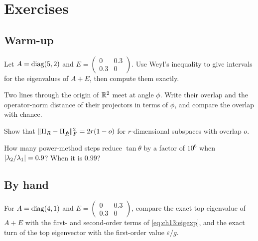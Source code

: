 \let\sectionmark\ompSavedSectionmarkxiii
\section*{Exercises}

\subsection*{Warm-up}

\begin{exercise}\label{exr:ch13:weyl}
Let $A=\operatorname{diag}(5,2)$ and $E=\begin{pmatrix}0&0.3\\0.3&0\end{pmatrix}$. Use Weyl's
inequality to give intervals for the eigenvalues of $A+E$, then compute them
exactly.
\end{exercise}

\begin{exercise}\label{exr:ch13:lines}
Two lines through the origin of $\mathbb{R}^2$ meet at angle $\phi$. Write their overlap
and the operator-norm distance of their projectors in terms of $\phi$, and compare
the overlap with chance.
\end{exercise}

\begin{exercise}\label{exr:ch13:projfrob}
Show that $\lVert \Pi_R-\Pi_{\hat R}\rVert_F^2=2r(1-o)$ for $r$-dimensional subspaces with
overlap $o$.
\end{exercise}

\begin{exercise}\label{exr:ch13:iters}
How many power-method steps reduce $\tan\theta$ by a factor of $10^{6}$ when
$\lvert \lambda_2/\lambda_1\rvert=0.9$? When it is $0.99$?
\end{exercise}

\subsection*{By hand}

\begin{exercise}\label{exr:ch13:second}
For $A=\operatorname{diag}(4,1)$ and $E=\begin{pmatrix}0&0.3\\0.3&0\end{pmatrix}$, compare the
exact top eigenvalue of $A+E$ with the first- and second-order terms of
\cref{eq:ch13:eigexp}, and the exact turn of the top eigenvector with the
first-order value $\varepsilon/g$.
\end{exercise}

